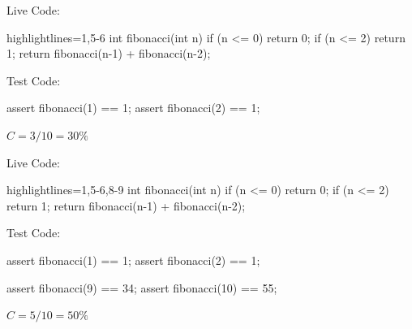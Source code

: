 \documentclass{article}
\begin{document}

\begin{multicols}{2}
Live Code:\par
{\small\begin{ffcode*}{highlightlines={1,5-6}}
int fibonacci(int n) {
  if (n <= 0) {
    return 0;
  }
  if (n <= 2) {
    return 1;
  }
  return fibonacci(n-1)
    + fibonacci(n-2);
}
\end{ffcode*}
}
\par\columnbreak\par
Test Code:\par
{\small\begin{ffcode*}{}
assert fibonacci(1) == 1;
assert fibonacci(2) == 1;
\end{ffcode*}
}
\( C = 3/10 = 30\% \)
\end{multicols}
\plush{}

\begin{multicols}{2}
Live Code:\par
{\small\begin{ffcode*}{highlightlines={1,5-6,8-9}}
int fibonacci(int n) {
  if (n <= 0) {
    return 0;
  }
  if (n <= 2) {
    return 1;
  }
  return fibonacci(n-1)
    + fibonacci(n-2);
}
\end{ffcode*}
}
\par\columnbreak\par
Test Code:\par
{\small\begin{ffcode*}{}
assert fibonacci(1) == 1;
assert fibonacci(2) == 1;

assert fibonacci(9) == 34;
assert fibonacci(10) == 55;
\end{ffcode*}
}
\( C = 5/10 = 50\% \)
\end{multicols}
\plush{}


\end{document}
